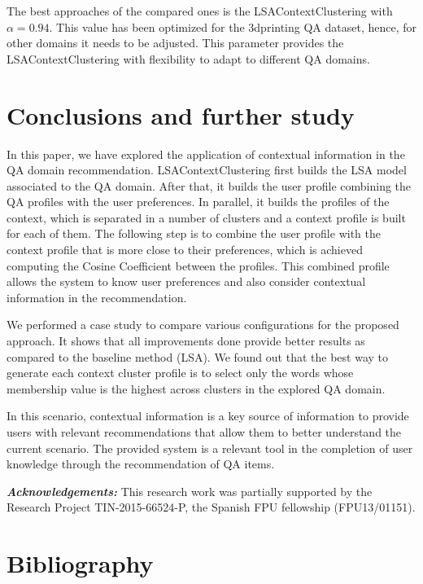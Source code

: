 \documentclass[preprint]{elsarticle}
\begin{document}
\begin{spacing}{1.5}
The best approaches of the compared ones is the LSAContextClustering with $\alpha=0.94$. This value has been optimized for the 3dprinting QA dataset, hence, for other domains it needs to be adjusted. This parameter provides the LSAContextClustering with flexibility to adapt to different QA domains.

\section{Conclusions and further study}
\label{sec:conclusions}

In this paper, we have explored the application of contextual information in the QA domain recommendation. LSAContextClustering first builds the LSA model associated to the QA domain. After that, it builds the user profile combining the QA profiles with the user preferences. In parallel, it builds the profiles of the context, which is separated in a number of clusters and a context profile is built for each of them. The following step is to combine the user profile with the context profile that is more close to their preferences, which is achieved computing the Cosine Coefficient between the profiles. This combined profile allows the system to know user preferences and also consider contextual information in the recommendation. 

We performed a case study to compare various configurations for the proposed approach. It shows that all improvements done provide better results as compared to the baseline method (LSA). We found out that the best way to generate each context cluster profile is to select only the words whose membership value is the highest across clusters in the explored QA domain.

In this scenario, contextual information is a key source of information to provide users with relevant recommendations that allow them to better understand the current scenario. The provided system is a relevant tool in the completion of user knowledge through the recommendation of QA items.

\textbf{\textit{Acknowledgements:}} This research work was partially supported by the Research Project TIN-2015-66524-P, the Spanish FPU fellowship (FPU13/01151).

\section*{Bibliography}



\end{spacing}
\end{document}
